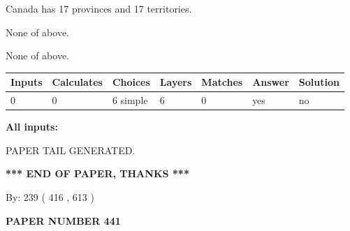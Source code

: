 \documentclass[12pt]{article}
\begin{document}
 
Canada has  17 provinces and  17 territories.
 
 
 None of above.
 
 
\noindent{}
 
 
 None of above.
 
 
\noindent{}
 
 
   
   
   
   
\noindent\begin{tabular}{|l|l|l|l|l|l|l|}
 \hline
Inputs & Calculates & Choices & Layers & Matches & Answer & Solution \\ \hline
 0  & 
 0  & 
 6
  simple  
  & 
 6  & 
 0  & 
  yes & 
  no 
  \\ \hline
 \end{tabular}
   
   
   
   
\noindent{}
   
   
   
   
\noindent\vspace{0.1in}\hspace{-0.08in} {\textbf{\Large{All inputs: }}}
   
   
   
   
   
   
 \vspace{0.2in}
 
   
   
\vspace{2.0in} PAPER TAIL GENERATED.
   
   
   
   
\vspace{1.0in} 
{\textbf{\large{ *** END OF PAPER, THANKS *** }}} 
   
   
\hspace{1.0in} By: 
 239 ( 416 ,  613 )
   
   
   
   
\newpage 
\setcounter{page}{ 
   441001 } 
   
   
   
   
 {\textbf{ \Large{ PAPER NUMBER  441  }}}
   
\end{document}
